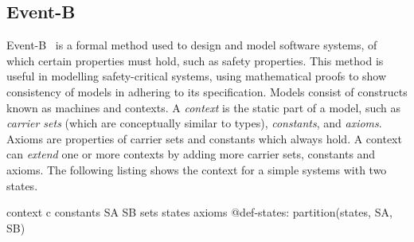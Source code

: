 \subsection{Event-B}
\label{sec:event-b}
Event-B~\cite{abrial10:_model_event_b} is a formal method used to
design and model software systems, of which certain properties must
hold, such as safety properties. This method is useful in modelling
safety-critical systems, using mathematical proofs to show consistency
of models in adhering to its specification. Models consist of
constructs known as machines and contexts. A \emph{context} is the
static part of a model, such as \emph{carrier sets} (which are
conceptually similar to types), \emph{constants}, and \emph{axioms}.
Axioms are properties of carrier sets and constants which always hold.  A context can \emph{extend} one or more contexts by adding more carrier sets, constants and axioms. The following listing shows the context for a simple systems with two states.
\begin{EventBcode}
context c
constants SA SB
sets states
axioms @def-states: partition(states, {SA}, {SB})
\end{EventBcode}


